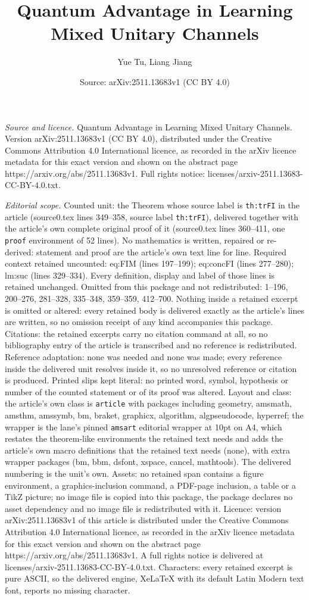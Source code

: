 \documentclass[10pt,a4paper]{amsart}
\title[Quantum Advantage in Learning Mixed Unitary Channels]{Quantum Advantage in Learning Mixed Unitary Channels}
\author{Yue Tu, Liang Jiang}
\date{Source: arXiv:2511.13683v1 (CC BY 4.0)}
\begin{document}
\maketitle

\noindent\emph{Source and licence.} Quantum Advantage in Learning Mixed Unitary Channels. Version arXiv:2511.13683v1 (CC BY 4.0), distributed under the Creative Commons Attribution 4.0 International licence, as recorded in the arXiv licence metadata for this exact version and shown on the abstract page https://arxiv.org/abs/2511.13683v1. Full rights notice: licenses/arxiv-2511.13683-CC-BY-4.0.txt.\par\smallskip

\noindent\textit{Editorial scope.} Counted unit: the Theorem whose source label is \texttt{th:trFI} in the article (source0.tex lines 349--358, source label \texttt{th:trFI}), delivered together with the article's own complete original proof of it (source0.tex lines 360--411, one \texttt{proof} environment of 52 lines). No mathematics is written, repaired or re-derived: statement and proof are the article's own text line for line. Required context retained uncounted: eq:FIM (lines 197--199); eq:concFI (lines 277--280); lm:suc (lines 329--334). Every definition, display and label of those lines is retained unchanged. Omitted from this package and not redistributed: 1--196, 200--276, 281--328, 335--348, 359--359, 412--700. Nothing inside a retained excerpt is omitted or altered: every retained body is delivered exactly as the article's lines are written, so no omission receipt of any kind accompanies this package. Citations: the retained excerpts carry no citation command at all, so no bibliography entry of the article is transcribed and no reference is redistributed. Reference adaptation: none was needed and none was made; every reference inside the delivered unit resolves inside it, so no unresolved reference or citation is produced. Printed slips kept literal: no printed word, symbol, hypothesis or number of the counted statement or of its proof was altered. Layout and class: the article's own class is \texttt{article} with packages including geometry, amsmath, amsthm, amssymb, bm, braket, graphicx, algorithm, algpseudocode, hyperref; the wrapper is the lane's pinned \texttt{amsart} editorial wrapper at 10pt on A4, which restates the theorem-like environments the retained text needs and adds the article's own macro definitions that the retained text needs (none), with extra wrapper packages (bm, bbm, dsfont, xspace, cancel, mathtools). The delivered numbering is the unit's own. Assets: no retained span contains a figure environment, a graphics-inclusion command, a PDF-page inclusion, a table or a TikZ picture; no image file is copied into this package, the package declares no asset dependency and no image file is redistributed with it. Licence: version arXiv:2511.13683v1 of this article is distributed under the Creative Commons Attribution 4.0 International licence, as recorded in the arXiv licence metadata for this exact version and shown on the abstract page https://arxiv.org/abs/2511.13683v1. A full rights notice is delivered at licenses/arxiv-2511.13683-CC-BY-4.0.txt. Characters: every retained excerpt is pure ASCII, so the delivered engine, XeLaTeX with its default Latin Modern text font, reports no missing character.
\end{document}
